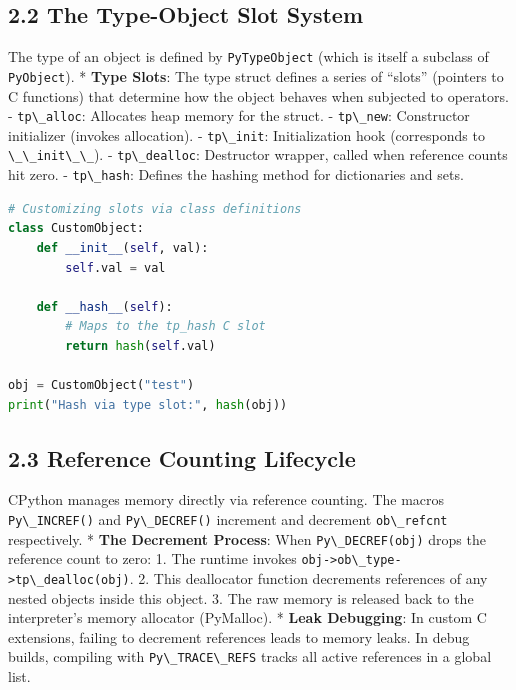 \hypertarget{the-type-object-slot-system}{%
\subsection{2.2 The Type-Object Slot
System}\label{the-type-object-slot-system}}

The type of an object is defined by
\passthrough{\lstinline!PyTypeObject!} (which is itself a subclass of
\passthrough{\lstinline!PyObject!}). * \textbf{Type Slots}: The type
struct defines a series of ``slots'' (pointers to C functions) that
determine how the object behaves when subjected to operators. -
\passthrough{\lstinline!tp\_alloc!}: Allocates heap memory for the
struct. - \passthrough{\lstinline!tp\_new!}: Constructor initializer
(invokes allocation). - \passthrough{\lstinline!tp\_init!}:
Initialization hook (corresponds to
\passthrough{\lstinline!\_\_init\_\_!}). -
\passthrough{\lstinline!tp\_dealloc!}: Destructor wrapper, called when
reference counts hit zero. - \passthrough{\lstinline!tp\_hash!}: Defines
the hashing method for dictionaries and sets.

\begin{lstlisting}[language=Python]
# Customizing slots via class definitions
class CustomObject:
    def __init__(self, val):
        self.val = val

    def __hash__(self):
        # Maps to the tp_hash C slot
        return hash(self.val)

obj = CustomObject("test")
print("Hash via type slot:", hash(obj))
\end{lstlisting}

\hypertarget{reference-counting-lifecycle}{%
\subsection{2.3 Reference Counting
Lifecycle}\label{reference-counting-lifecycle}}

CPython manages memory directly via reference counting. The macros
\passthrough{\lstinline!Py\_INCREF()!} and
\passthrough{\lstinline!Py\_DECREF()!} increment and decrement
\passthrough{\lstinline!ob\_refcnt!} respectively. * \textbf{The
Decrement Process}: When \passthrough{\lstinline!Py\_DECREF(obj)!} drops
the reference count to zero: 1. The runtime invokes
\passthrough{\lstinline!obj->ob\_type->tp\_dealloc(obj)!}. 2. This
deallocator function decrements references of any nested objects inside
this object. 3. The raw memory is released back to the interpreter's
memory allocator (PyMalloc). * \textbf{Leak Debugging}: In custom C
extensions, failing to decrement references leads to memory leaks. In
debug builds, compiling with \passthrough{\lstinline!Py\_TRACE\_REFS!}
tracks all active references in a global list.

